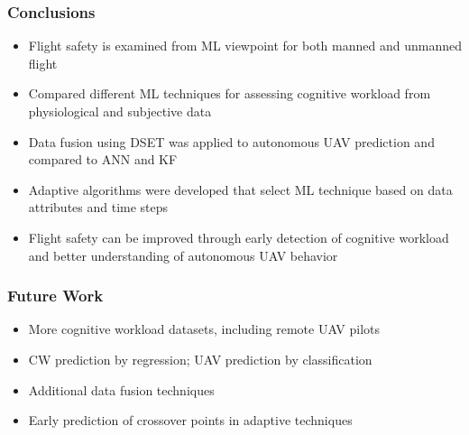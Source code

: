 \documentclass{beamer}
\begin{document}
\begin{frame}
\frametitle{Conclusions}
\begin{itemize}
\item{Flight safety is examined from ML viewpoint for both manned and unmanned flight}
\item{Compared different ML techniques for assessing cognitive workload from physiological and subjective data}
\item{Data fusion using DSET was applied to autonomous UAV prediction and compared to ANN and KF}
\item{Adaptive algorithms were developed that select ML technique based on data attributes and time steps}
\item{Flight safety can be improved through early detection of cognitive workload and better understanding of autonomous UAV behavior}
\end{itemize}
\end{frame}

\begin{frame}
\frametitle{Future Work}
\begin{itemize}
\item{More cognitive workload datasets, including remote UAV pilots}
\item{CW prediction by regression; UAV prediction by classification}
\item{Additional data fusion techniques}
\item{Early prediction of crossover points in adaptive techniques}
\end{itemize}
\end{frame}
\end{document}
